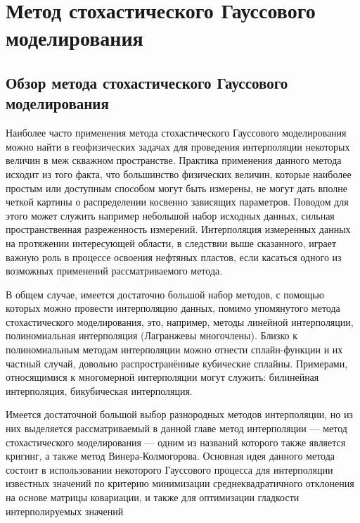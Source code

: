 \chapter{Метод стохастического Гауссового моделирования} \label{chapt1}

\section{Обзор метода стохастического Гауссового моделирования} \label{sect1_1}
Наиболее часто применения метода стохастического Гауссового моделирования можно найти в геофизических задачах для проведения интерполяции некоторых величин в меж скважном пространстве\cite[с.~33]{chung2019supplement}. Практика применения данного метода исходит из того факта, что большинство физических величин, которые наиболее простым или доступным способом могут быть измерены, не могут дать вполне четкой картины о распределении косвенно зависящих параметров. Поводом для этого может служить например небольшой набор исходных данных, сильная пространственная разреженность измерений. Интерполяция измеренных данных на протяжении интересующей области, в следствии выше сказанного, играет важную роль в процессе освоения нефтяных пластов, если касаться одного из возможных применений рассматриваемого метода. 

В общем случае, имеется достаточно большой набор методов, с помощью которых можно провести интерполяцию данных, помимо упомянутого метода стохастического моделирования, это, например, методы линейной интерполяции, полиномиальная интерполяция (Лагранжевы многочлены). Близко к полиномиальным методам интерполяции можно отнести сплайн-функции и их частный случай, довольно распространённые кубические сплайны. Примерами, относящимися к многомерной интерполяции могут служить: билинейная интерполяция, бикубическая интерполяция.

Имеется достаточной большой выбор разнородных методов интерполяции, но из них выделяется рассматриваемый в данной главе метод интерполяции — метод стохастического моделирования — одним из названий которого также является кригинг, а также метод Винера-Колмогорова. Основная идея данного метода состоит в использовании некоторого Гауссового процесса для интерполяции известных значений по критерию минимизации среднеквадратичного отклонения на основе матрицы ковариации, и также для оптимизации гладкости интерполируемых значений

